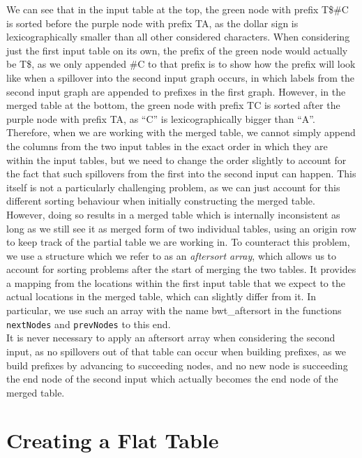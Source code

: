 \documentclass[a4paper,12pt,twoside,BCOR=10mm]{scrbook}
\begin{document}
We can see that in the input table at the top, the green node with prefix T\$$\#$C is sorted
before the purple node with prefix TA,
as the dollar sign is lexicographically smaller
than all other considered characters.
When considering just the first input table on its own, the prefix of the green node would actually be T\$,
as we only appended $\#$C to that prefix is to show
how the prefix will look like when a spillover into the second input graph occurs, in which labels from the
second input graph are appended to prefixes in the first graph.
However, in the merged table at the bottom, the green node with prefix TC is sorted after the purple node with prefix TA,
as “C” is lexicographically bigger than “A”. \\
Therefore, when we are working with the merged table, we cannot simply append the columns from the two input
tables in the exact order in which they are within the input tables, but we need to change the order slightly
to account for the fact that such spillovers from the first into the second input can happen.
This itself is not a particularly challenging problem, as we can just account for this different sorting
behaviour when initially constructing the merged table. \\
However, doing so results in a merged table which is internally inconsistent as long as we still
see it as merged form of two individual tables, using an origin row to keep track of the partial table
we are working in.
To counteract this problem, we use a structure which we refer to as an \textit{aftersort array},
which allows us to account for sorting problems after the start of merging the two tables.
It provides a mapping from the locations within the first input table that we expect
to the actual locations in the merged table, which can slightly differ from it.
In particular, we use such an array with the name bwt\_aftersort in
the functions \texttt{nextNodes} and \texttt{prevNodes} to this end. \\
It is never necessary to apply an aftersort array when considering the second input,
as no spillovers out of that table can occur when building prefixes, as we build
prefixes by advancing to succeeding nodes, and no new node is succeeding the end node
of the second input which actually becomes the end node of the merged table.

\section{Creating a Flat Table}
%
\end{document}
